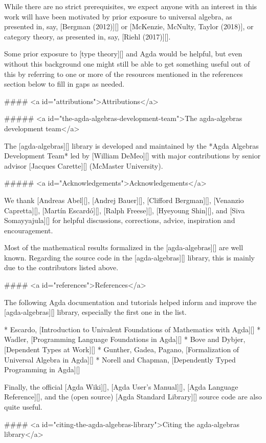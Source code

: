 While there are no strict prerequisites, we expect anyone with an interest in this
work will have been motivated by prior exposure to universal algebra, as presented
in, say, [Bergman (2012)][] or [McKenzie, McNulty, Taylor (2018)], or category
theory, as presented in, say, [Riehl (2017)][].

Some prior exposure to [type theory][] and Agda would be helpful, but even without
this background one might still be able to get something useful out of this by
referring to one or more of the resources mentioned in the references section
below to fill in gaps as needed.


#### <a id="attributions">Attributions</a>

##### <a id="the-agda-algebras-development-team">The agda-algebras development team</a>

The [agda-algebras][] library is developed and maintained by the *Agda Algebras
Development Team* led by [William DeMeo][] with major contributions by senior
advisor [Jacques Carette][] (McMaster University).

##### <a id="Acknowledgements">Acknowledgements</a>

We thank [Andreas Abel][], [Andrej Bauer][], [Clifford Bergman][], [Venanzio
Capretta][], [Martín Escardó][], [Ralph Freese][], [Hyeyoung Shin][], and [Siva
Somayyajula][] for helpful discussions, corrections, advice, inspiration and
encouragement.

Most of the mathematical results formalized in the [agda-algebras][]
are well known. Regarding the source code in the [agda-algebras][]
library, this is mainly due to the contributors listed above.


#### <a id="references">References</a>

The following Agda documentation and tutorials helped inform and improve the
[agda-algebras][] library, especially the first one in the list.

* Escardo, [Introduction to Univalent Foundations of Mathematics with Agda][]
* Wadler, [Programming Language Foundations in Agda][]
* Bove and Dybjer, [Dependent Types at Work][]
* Gunther, Gadea, Pagano, [Formalization of Universal Algebra in Agda][]
* Norell and Chapman, [Dependently Typed Programming in Agda][]

Finally, the official [Agda Wiki][], [Agda User's Manual][], [Agda Language
Reference][], and the (open source) [Agda Standard Library][] source code are also
quite useful.


#### <a id="citing-the-agda-algebras-library">Citing the agda-algebras library</a>

